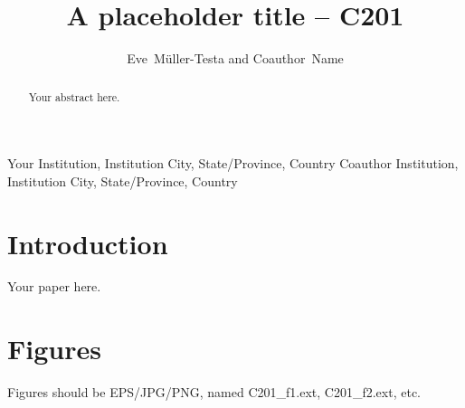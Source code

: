 \documentclass[11pt,twoside]{article}
\begin{document}
\title{A placeholder title -- C201}

\author{Eve~Müller-Testa and Coauthor~Name}
Your Institution, Institution City, State/Province, Country
Coauthor Institution, Institution City, State/Province, Country



\begin{abstract}
Your abstract here.
\end{abstract}

\section{Introduction}

Your paper here.

\section{Figures}

Figures should be EPS/JPG/PNG, named C201\_f1.ext, C201\_f2.ext, etc.

% 
\end{document}
